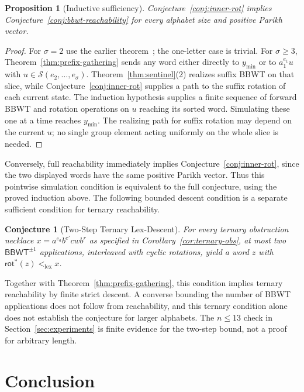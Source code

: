 \documentclass[11pt,a4paper]{article}
\newtheorem{proposition}{Proposition}
\newtheorem{conjecture}{Conjecture}
\theoremstyle{definition}
\newcommand{\BBWT}{\mathsf{BBWT}}
\newcommand{\rot}{\mathsf{rot}}
\newcommand{\lex}{\mathrm{lex}}
\begin{document}
\begin{proposition}[Inductive sufficiency]
\label{prop:inner-sufficiency}
Conjecture~\ref{conj:inner-rot} implies Conjecture~\ref{conj:bbwt-reachability} for every alphabet size and positive Parikh vector.
\end{proposition}

\begin{proof}
For $\sigma=2$ use the earlier theorem~\cite{BadkobehBannaiIKoppl2026}; the one-letter case is trivial. For $\sigma\ge3$, Theorem~\ref{thm:prefix-gathering} sends any word either directly to $y_{\min}$ or to $a_1^{e_1}u$ with $u\in\mathcal{S}(e_2,\dots,e_\sigma)$. Theorem~\ref{thm:sentinel}(2) realizes suffix BBWT on that slice, while Conjecture~\ref{conj:inner-rot} supplies a path to the suffix rotation of each current state. The induction hypothesis supplies a finite sequence of forward BBWT and rotation operations on $u$ reaching its sorted word. Simulating these one at a time reaches $y_{\min}$. The realizing path for suffix rotation may depend on the current $u$; no single group element acting uniformly on the whole slice is needed.
\end{proof}

Conversely, full reachability immediately implies Conjecture~\ref{conj:inner-rot}, since the two displayed words have the same positive Parikh vector. Thus this pointwise simulation condition is equivalent to the full conjecture, using the proved induction above. The following bounded descent condition is a separate sufficient condition for ternary reachability.

\begin{conjecture}[Two-Step Ternary Lex-Descent]
\label{conj:twostep}
For every ternary obstruction necklace $x=a^{e_a}b^{e'}cwb^r$ as specified in Corollary~\ref{cor:ternary-obs}, at most two $\BBWT^{\pm1}$ applications, interleaved with cyclic rotations, yield a word $z$ with $\rot^*(z)<_{\lex}x$.
\end{conjecture}

Together with Theorem~\ref{thm:prefix-gathering}, this condition implies ternary reachability by finite strict descent. A converse bounding the number of BBWT applications does not follow from reachability, and this ternary condition alone does not establish the conjecture for larger alphabets. The $n\le13$ check in Section~\ref{sec:experiments} is finite evidence for the two-step bound, not a proof for arbitrary length.

\section{Conclusion}
\end{document}
